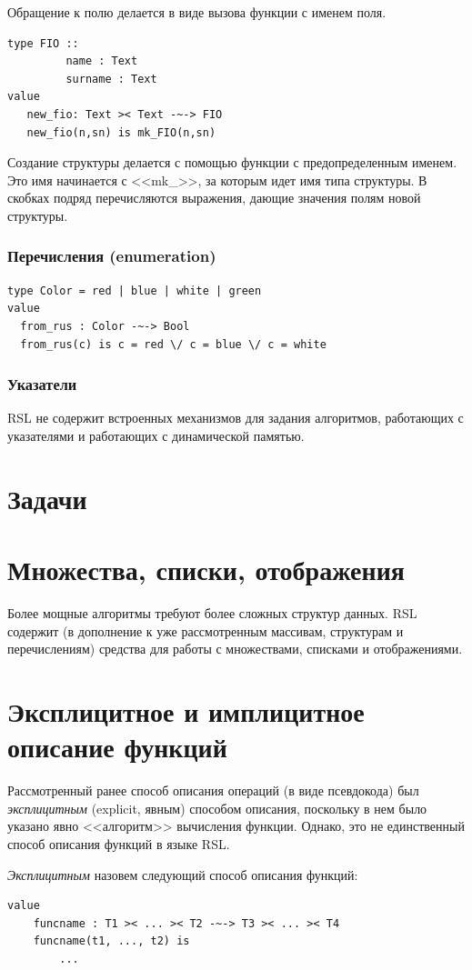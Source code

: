 \documentclass[14pt, twoside]{extreport}
\newcounter{problem_type}[chapter]
\newcommand{\head}[1]{\vspace{1cm}\subsubsection*{#1}}
\begin{document}
Обращение к полю делается в виде вызова функции с именем поля.

\begin{lstlisting}
type FIO ::
         name : Text
         surname : Text
value
   new_fio: Text >< Text -~-> FIO
   new_fio(n,sn) is mk_FIO(n,sn)
\end{lstlisting}

Создание структуры делается с помощью функции с предопределенным именем. Это имя начинается с <<mk\_>>, за которым идет имя типа структуры. В скобках подряд перечисляются выражения, дающие значения полям новой структуры.

\head{Перечисления (enumeration)}
\begin{lstlisting}
type Color = red | blue | white | green
value
  from_rus : Color -~-> Bool
  from_rus(c) is c = red \/ c = blue \/ c = white
\end{lstlisting}

\head{Указатели}
RSL не содержит встроенных механизмов для задания алгоритмов, работающих с указателями и работающих с динамической памятью.

    \section*{Задачи}

    

\section{Множества, списки, отображения}

Более мощные алгоритмы требуют более сложных структур данных. RSL содержит (в дополнение к уже рассмотренным массивам, структурам и перечислениям) средства для работы с множествами, списками и отображениями. 



\section{Эксплицитное и имплицитное описание функций}

Рассмотренный ранее способ описания операций (в виде псевдокода) был \emph{эксплицитным} (explicit, явным) способом описания, поскольку в нем было указано явно <<алгоритм>> вычисления функции. Однако, это не единственный способ описания функций в языке RSL.

\emph{Эксплицитным} назовем следующий способ описания функций:
\begin{lstlisting}
value
	funcname : T1 >< ... >< T2 -~-> T3 >< ... >< T4
	funcname(t1, ..., t2) is
		... 
\end{lstlisting}
\end{document}
